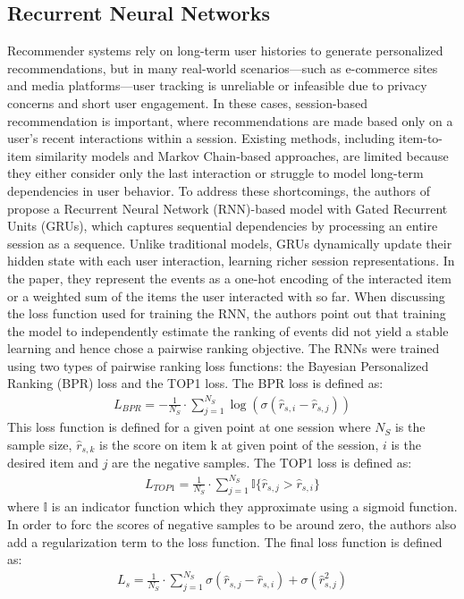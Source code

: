 \documentclass{ieeetj}
\begin{document}
\subsection{Recurrent Neural Networks\cite{hidasi2015session} }
Recommender systems rely on long-term user histories to generate personalized recommendations, but in many real-world scenarios—such as e-commerce sites and media platforms—user tracking is unreliable or infeasible due to privacy concerns and short user engagement. In these cases, session-based recommendation is important, where recommendations are made based only on a user's recent interactions within a session. Existing methods, including item-to-item similarity models and Markov Chain-based approaches, are limited because they either consider only the last interaction or struggle to model long-term dependencies in user behavior. To address these shortcomings, the authors of propose a Recurrent Neural Network (RNN)-based model with Gated Recurrent Units (GRUs), which captures sequential dependencies by processing an entire session as a sequence. Unlike traditional models, GRUs dynamically update their hidden state with each user interaction, learning richer session representations. In the paper, they represent the events as a one-hot encoding of the interacted item or a weighted sum of the items the user interacted with so far. When discussing the loss function used for training the RNN, the authors point out that training the model to independently estimate the ranking of events did not yield a stable learning and hence chose a pairwise ranking objective. The RNNs were trained using two types of pairwise ranking loss functions: the Bayesian Personalized Ranking (BPR) loss and the TOP1 loss. The BPR loss is defined as:
\begin{equation}
\label{eq:bpr}
\begin{aligned}
	L_{BPR}=-\frac{1}{N_S} \cdot \sum_{j=1}^{N_S} \log\left( \sigma(\hat{r}_{s,i} - \hat{r}_{s,j}) \right)
\end{aligned}
\end{equation}
This loss function is defined for a given point at one session where $N_S$ is the sample size, $\hat{r}_{s,k}$ is the score on item k at given point of the session, $i$ is the desired item and $j$ are the negative samples. 
The TOP1 loss is defined as:
\begin{equation}
\label{eq:top1}
\begin{aligned}
	L_{TOP1} = \frac{1}{N_S} \cdot \sum_{j=1}^{N_S} \mathbb{I}\{\hat{r}_{s,j} > \hat{r}_{s,i}\}
\end{aligned}
\end{equation}
where $\mathbb{I}$ is an indicator function which they approximate using a sigmoid function. In order to forc the scores of negative samples to be around zero, the authors also add a regularization term to the loss function. The final loss function is defined as:
\begin{equation}
\label{eq:final loss}
\begin{aligned}
	L_s = \frac{1}{N_S} \cdot \sum_{j=1}^{N_S} \sigma\left(\hat{r}_{s,j} - \hat{r}_{s,i}\right) + \sigma\left(\hat{r}_{s,j}^2\right)
\end{aligned}
\end{equation}
\end{document}
